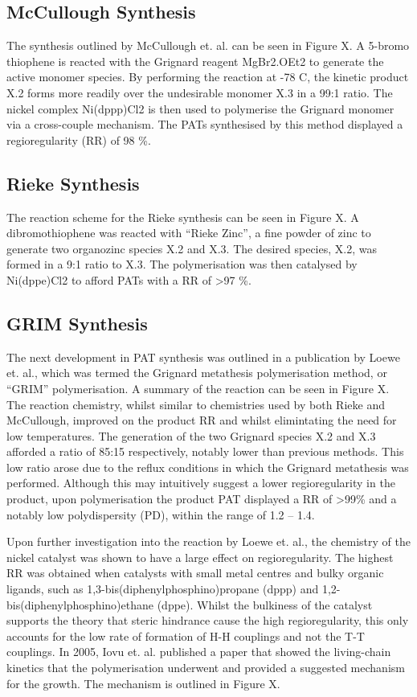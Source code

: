 \subsection{McCullough Synthesis}

The synthesis outlined by McCullough et. al. can be seen in Figure X. A 5-bromo thiophene is reacted with the Grignard reagent MgBr2.OEt2 to generate the active monomer species. By performing the reaction at -78 C, the kinetic product X.2 forms more readily over the undesirable monomer X.3 in a 99:1 ratio. The nickel complex Ni(dppp)Cl2 is then used to polymerise the Grignard monomer via a cross-couple mechanism. The PATs synthesised by this method displayed a regioregularity (RR) of 98 \%.

\subsection{Rieke Synthesis}

The reaction scheme for the Rieke synthesis can be seen in Figure X. A dibromothiophene was reacted with “Rieke Zinc”, a fine powder of zinc to generate two organozinc species X.2 and X.3. The desired species, X.2, was formed in a 9:1 ratio to X.3. The polymerisation was then catalysed by Ni(dppe)Cl2 to afford PATs with a RR of >97 \%.

\subsection{GRIM Synthesis}

The next development in PAT synthesis was outlined in a publication by Loewe et. al., which was termed the Grignard metathesis polymerisation method, or “GRIM” polymerisation. A summary of the reaction can be seen in Figure X. The reaction chemistry, whilst similar to chemistries used by both Rieke and McCullough, improved on the product RR and whilst elimintating the need for low temperatures. The generation of the two Grignard species X.2 and X.3 afforded a ratio of 85:15 respectively, notably lower than previous methods. This low ratio arose due to the reflux conditions in which the Grignard metathesis was performed. Although this may intuitively suggest a lower regioregularity in the product, upon polymerisation the product PAT displayed a RR of >99\% and a notably low polydispersity (PD), within the range of 1.2 – 1.4.

Upon further investigation into the reaction by Loewe et. al., the chemistry of the nickel catalyst was shown to have a large effect on regioregularity. The highest RR was obtained when catalysts with small metal centres and bulky organic ligands, such as 1,3-bis(diphenylphosphino)propane (dppp) and 1,2-bis(diphenylphosphino)ethane (dppe). Whilst the bulkiness of the catalyst supports the theory that steric hindrance cause the high regioregularity, this only accounts for the low rate of formation of H-H couplings and not the T-T couplings. In 2005, Iovu et. al. published a paper that showed the living-chain kinetics that the polymerisation underwent and provided a suggested mechanism for the growth. The mechanism is outlined in Figure X.

